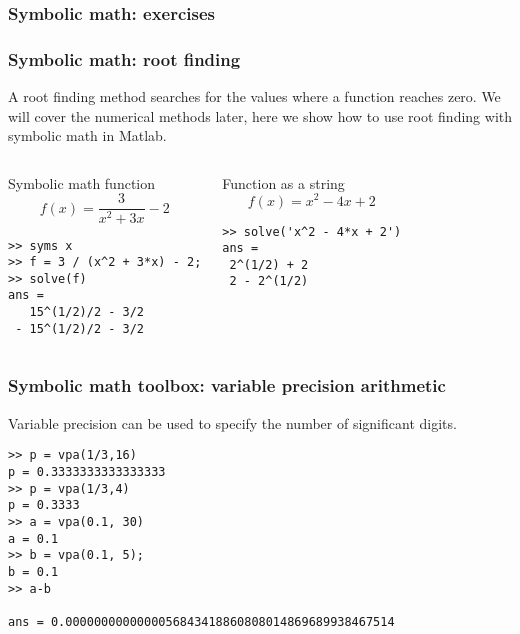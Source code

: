 \documentclass[11pt,table,final,fleqn,xcolor={usenames,dvipsnames}]{beamer}
\begin{document}
\begin{frame}[fragile]
  \frametitle{Symbolic math: exercises}
  \pause
\end{frame}

\begin{frame}[fragile]
  \frametitle{Symbolic math: root finding }
  A root finding method searches for the values where a function reaches zero. We will cover the numerical methods later, here we show how to use root finding with symbolic math in Matlab.
  \begin{columns}[T]
   \begin{block}{Symbolic math function}
  \[ f(x) =   \frac{3}{x^2 + 3x} - 2 \]
  \pause
  \begin{lstlisting}
>> syms x
>> f = 3 / (x^2 + 3*x) - 2;
>> solve(f)
ans =
   15^(1/2)/2 - 3/2
 - 15^(1/2)/2 - 3/2
    \end{lstlisting}
   \end{block}
    \pause   
  \begin{block}{Function as a string}
\[ f(x) = x^2 - 4x + 2 \]
    \pause
    \begin{lstlisting}
>> solve('x^2 - 4*x + 2')
ans =
 2^(1/2) + 2
 2 - 2^(1/2)
    \end{lstlisting}
  \end{block}
  \end{columns}
\end{frame}

\begin{frame}[fragile]
  \frametitle{Symbolic math toolbox: variable precision arithmetic}
  Variable precision can be used to specify the number of significant digits.
      \begin{lstlisting}
>> p = vpa(1/3,16)
p = 0.3333333333333333
>> p = vpa(1/3,4)
p = 0.3333
>> a = vpa(0.1, 30)
a = 0.1
>> b = vpa(0.1, 5);
b = 0.1
>> a-b
 
ans = 0.0000000000000056843418860808014869689938467514
\end{lstlisting}
\end{frame}
\end{document}
